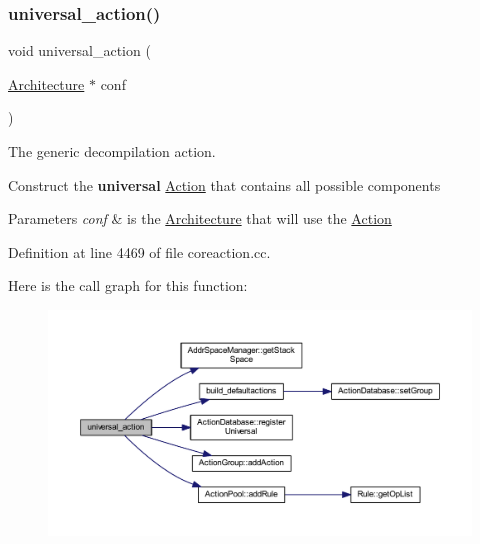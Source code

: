 \subsubsection{\texorpdfstring{universal\_action()}{universal\_action()}}
{\footnotesize\ttfamily void universal\+\_\+action (\begin{DoxyParamCaption}\item[{\mbox{\hyperlink{class_architecture}{Architecture}} $\ast$}]{conf }\end{DoxyParamCaption})}



The generic decompilation action. 

Construct the {\bfseries{universal}} \mbox{\hyperlink{class_action}{Action}} that contains all possible components 
\begin{DoxyParams}{Parameters}
{\em conf} & is the \mbox{\hyperlink{class_architecture}{Architecture}} that will use the \mbox{\hyperlink{class_action}{Action}} \\
\hline
\end{DoxyParams}


Definition at line 4469 of file coreaction.\+cc.

Here is the call graph for this function\+:
\nopagebreak
\begin{figure}[H]
\begin{center}
\leavevmode
\includegraphics[width=350pt]{coreaction_8hh_a122798abac4d42f44020ef5d71d689e3_cgraph}
\end{center}
\end{figure}
